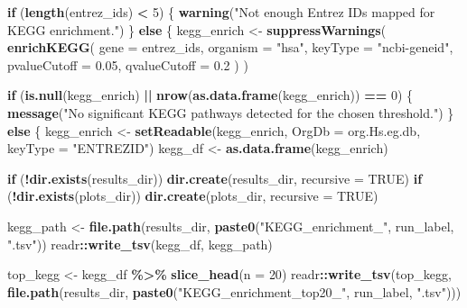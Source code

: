 \documentclass[
]{article}
\newenvironment{Shaded}{\begin{snugshade}}{\end{snugshade}}
\newcommand{\AttributeTok}[1]{\textcolor[rgb]{0.13,0.29,0.53}{#1}}
\newcommand{\ConstantTok}[1]{\textcolor[rgb]{0.56,0.35,0.01}{#1}}
\newcommand{\ControlFlowTok}[1]{\textcolor[rgb]{0.13,0.29,0.53}{\textbf{#1}}}
\newcommand{\DecValTok}[1]{\textcolor[rgb]{0.00,0.00,0.81}{#1}}
\newcommand{\FloatTok}[1]{\textcolor[rgb]{0.00,0.00,0.81}{#1}}
\newcommand{\FunctionTok}[1]{\textcolor[rgb]{0.13,0.29,0.53}{\textbf{#1}}}
\newcommand{\NormalTok}[1]{#1}
\newcommand{\OtherTok}[1]{\textcolor[rgb]{0.56,0.35,0.01}{#1}}
\newcommand{\SpecialCharTok}[1]{\textcolor[rgb]{0.81,0.36,0.00}{\textbf{#1}}}
\newcommand{\StringTok}[1]{\textcolor[rgb]{0.31,0.60,0.02}{#1}}
\begin{document}
\begin{Shaded}
\begin{Highlighting}[]
  \ControlFlowTok{if}\NormalTok{ (}\FunctionTok{length}\NormalTok{(entrez\_ids) }\SpecialCharTok{\textless{}} \DecValTok{5}\NormalTok{) \{}
    \FunctionTok{warning}\NormalTok{(}\StringTok{"Not enough Entrez IDs mapped for KEGG enrichment."}\NormalTok{)}
\NormalTok{  \} }\ControlFlowTok{else}\NormalTok{ \{}
\NormalTok{    kegg\_enrich }\OtherTok{\textless{}{-}} \FunctionTok{suppressWarnings}\NormalTok{(}
      \FunctionTok{enrichKEGG}\NormalTok{(}
        \AttributeTok{gene =}\NormalTok{ entrez\_ids,}
        \AttributeTok{organism =} \StringTok{"hsa"}\NormalTok{,}
        \AttributeTok{keyType =} \StringTok{"ncbi{-}geneid"}\NormalTok{,}
        \AttributeTok{pvalueCutoff =} \FloatTok{0.05}\NormalTok{,}
        \AttributeTok{qvalueCutoff =} \FloatTok{0.2}
\NormalTok{      )}
\NormalTok{    )}

    \ControlFlowTok{if}\NormalTok{ (}\FunctionTok{is.null}\NormalTok{(kegg\_enrich) }\SpecialCharTok{||} \FunctionTok{nrow}\NormalTok{(}\FunctionTok{as.data.frame}\NormalTok{(kegg\_enrich)) }\SpecialCharTok{==} \DecValTok{0}\NormalTok{) \{}
      \FunctionTok{message}\NormalTok{(}\StringTok{"No significant KEGG pathways detected for the chosen threshold."}\NormalTok{)}
\NormalTok{    \} }\ControlFlowTok{else}\NormalTok{ \{}
\NormalTok{      kegg\_enrich }\OtherTok{\textless{}{-}} \FunctionTok{setReadable}\NormalTok{(kegg\_enrich, }\AttributeTok{OrgDb =}\NormalTok{ org.Hs.eg.db, }\AttributeTok{keyType =} \StringTok{"ENTREZID"}\NormalTok{)}
\NormalTok{      kegg\_df }\OtherTok{\textless{}{-}} \FunctionTok{as.data.frame}\NormalTok{(kegg\_enrich)}

      \ControlFlowTok{if}\NormalTok{ (}\SpecialCharTok{!}\FunctionTok{dir.exists}\NormalTok{(results\_dir)) }\FunctionTok{dir.create}\NormalTok{(results\_dir, }\AttributeTok{recursive =} \ConstantTok{TRUE}\NormalTok{)}
      \ControlFlowTok{if}\NormalTok{ (}\SpecialCharTok{!}\FunctionTok{dir.exists}\NormalTok{(plots\_dir)) }\FunctionTok{dir.create}\NormalTok{(plots\_dir, }\AttributeTok{recursive =} \ConstantTok{TRUE}\NormalTok{)}

\NormalTok{      kegg\_path }\OtherTok{\textless{}{-}} \FunctionTok{file.path}\NormalTok{(results\_dir, }\FunctionTok{paste0}\NormalTok{(}\StringTok{"KEGG\_enrichment\_"}\NormalTok{, run\_label, }\StringTok{".tsv"}\NormalTok{))}
\NormalTok{      readr}\SpecialCharTok{::}\FunctionTok{write\_tsv}\NormalTok{(kegg\_df, kegg\_path)}

\NormalTok{      top\_kegg }\OtherTok{\textless{}{-}}\NormalTok{ kegg\_df }\SpecialCharTok{\%\textgreater{}\%} \FunctionTok{slice\_head}\NormalTok{(}\AttributeTok{n =} \DecValTok{20}\NormalTok{)}
\NormalTok{      readr}\SpecialCharTok{::}\FunctionTok{write\_tsv}\NormalTok{(top\_kegg, }\FunctionTok{file.path}\NormalTok{(results\_dir, }\FunctionTok{paste0}\NormalTok{(}\StringTok{"KEGG\_enrichment\_top20\_"}\NormalTok{, run\_label, }\StringTok{".tsv"}\NormalTok{)))}


\end{Highlighting}
\end{Shaded}
\end{document}

